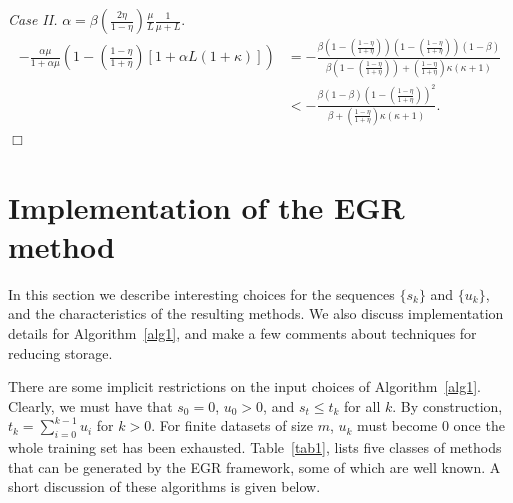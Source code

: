 \documentclass[11pt]{article}
\begin{document}
\textit{Case II.} $\alpha = \displaystyle\beta\left(\frac{2 \eta}{1-\eta} \right)\frac{\mu}{L}\frac{1}{\mu+L}$.
\begin{align*}
 -\frac{\alpha\mu}{1+\alpha\mu}\left(1-{\left(\frac{1-\eta}{1+\eta}\right)}[1+\alpha L(1+\kappa)]\right) &= -\frac{\beta(1-{\left(\frac{1-\eta}{1+\eta}\right)})(1-{\left(\frac{1-\eta}{1+\eta}\right)})(1-\beta)}{\beta(1-{\left(\frac{1-\eta}{1+\eta}\right)})+{\left(\frac{1-\eta}{1+\eta}\right)}\kappa(\kappa+1)}\\
 & < -\frac{\beta(1-\beta)(1-{\left(\frac{1-\eta}{1+\eta}\right)})^2}{\beta+{\left(\frac{1-\eta}{1+\eta}\right)}\kappa(\kappa+1)}.
\end{align*} 
\hspace*{\fill}$\Box$\medskip


 \section{Implementation of the EGR method}  \label{implementation}
 

 In this section we describe interesting choices for the sequences $\{s_k\}$ and $\{u_k\}$, and the characteristics of the resulting methods. We also discuss implementation details for  Algorithm~\ref{alg1}, and make a few comments about techniques for reducing storage. 
 
There are some implicit restrictions on the input choices of Algorithm~\ref{alg1}. Clearly, we must have that $s_0=0$, $u_0>0$, and $s_t \leq t_k$ for all $k$.  By construction, $t_k = \sum_{i=0}^{k-1} u_i$ for $k>0$. For finite datasets of size $m$, $u_k$ must become $0$ once the whole training set has been exhausted.
Table~\ref{tab1},  lists five classes of methods that can be generated by the EGR framework, some of which are well known. A short discussion of these algorithms is given below.
\end{document}
